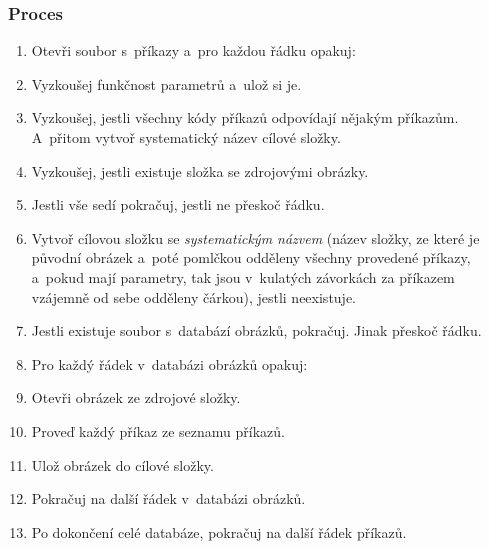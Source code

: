 \documentclass[12pt,oneside]{report}			%
\begin{document}
	\subsubsection{Proces}
	\begin{enumerate}
	\item{Otevři soubor s~příkazy a~pro každou řádku opakuj:}
	\item{Vyzkoušej funkčnost parametrů a~ulož si je.}
	\item{Vyzkoušej, jestli všechny kódy příkazů odpovídají nějakým příkazům. A~přitom vytvoř systematický název cílové složky.}
	\item{Vyzkoušej, jestli existuje složka se zdrojovými obrázky.}
	\item{Jestli vše sedí pokračuj, jestli ne přeskoč řádku.}
	\item{Vytvoř cílovou složku se \emph{systematickým názvem} (název složky, ze které je původní obrázek a~poté pomlčkou odděleny všechny provedené příkazy, a~pokud mají parametry, tak jsou v~kulatých závorkách za příkazem vzájemně od sebe odděleny čárkou), jestli neexistuje.}
	\item{Jestli existuje soubor s~databází obrázků, pokračuj. Jinak přeskoč řádku.}
	\item{Pro každý řádek v~databázi obrázků opakuj:}
	\item{Otevři obrázek ze zdrojové složky.}
	\item{Proveď každý příkaz ze seznamu příkazů.}
	\item{Ulož obrázek do cílové složky.}
	\item{Pokračuj na další řádek v~databázi obrázků.}
	\item{Po dokončení celé databáze, pokračuj na další řádek příkazů.}
	\end{enumerate}	
	
\end{document}
